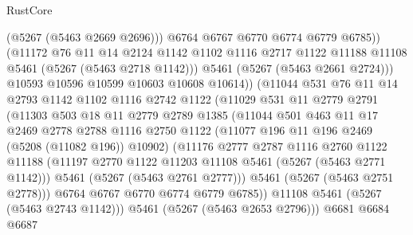 \begin{lexlean}{RustCore}
\begin{coremodule}
                          (@5267 (@5463 @2669 @2696)))
                        @6764
                        @6767
                        @6770
                        @6774
                        @6779
                        @6785))
                    (@11172
                      @76
                      @11
                      @14
                      @2124
                      @1142
                      @1102
                      @1116
                      @2717
                      @1122
                      @11188
                      @11108
                      @5461
                      (@5267 (@5463 @2718 @1142)))
                    @5461
                    (@5267 (@5463 @2661 @2724)))
                  @10593
                  @10596
                  @10599
                  @10603
                  @10608
                  @10614))
              (@11044
                @531
                @76
                @11
                @14
                @2793
                @1142
                @1102
                @1116
                @2742
                @1122
                (@11029
                  @531
                  @11
                  @2779
                  @2791
                  (@11303
                    @503
                    @18
                    @11
                    @2779
                    @2789
                    @1385
                    (@11044
                      @501
                      @463
                      @11
                      @17
                      @2469
                      @2778
                      @2788
                      @1116
                      @2750
                      @1122
                      (@11077 @196 @11 @196 @2469 (@5208 (@11082 @196)) @10902)
                      (@11176
                        @2777
                        @2787
                        @1116
                        @2760
                        @1122
                        @11188
                        (@11197 @2770 @1122 @11203 @11108 @5461 (@5267 (@5463 @2771 @1142)))
                        @5461
                        (@5267 (@5463 @2761 @2777)))
                      @5461
                      (@5267 (@5463 @2751 @2778)))
                    @6764
                    @6767
                    @6770
                    @6774
                    @6779
                    @6785))
                @11108
                @5461
                (@5267 (@5463 @2743 @1142)))
              @5461
              (@5267 (@5463 @2653 @2796)))
            @6681
            @6684
            @6687

\end{coremodule}
\end{lexlean}
